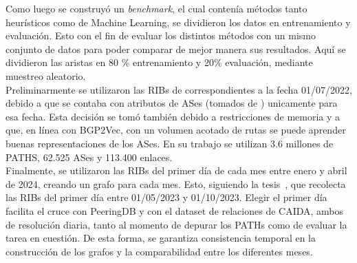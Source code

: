 Como luego se construyó un \textit{benchmark}, el cual contenía métodos tanto heurísticos como de Machine Learning, se dividieron los datos en entrenamiento y evaluación. Esto con el fin de evaluar los distintos métodos con un mismo conjunto de datos para poder comparar de mejor manera sus resultados. Aquí se dividieron las aristas en 80 \% entrenamiento y 20\% evaluación, mediante muestreo aleatorio.\\

Preliminarmente se utilizaron las RIBs de correspondientes a la fecha 01/07/2022,
debido a que se contaba con atributos de ASes (tomados de \cite{BenchmarkingGNN}) unicamente para esa fecha. Esta decisión se tomó también debido a restricciones de memoria y a que, en línea con BGP2Vec, con un volumen acotado de rutas se puede aprender buenas representaciones de los ASes. En su trabajo se utilizan 3.6 millones de PATHS, 62.525 ASes y 113.400 enlaces. \\







Finalmente, se utilizaron las RIBs del primer día de cada mes entre enero y abril de 2024, creando un grafo para cada mes. Esto, siguiendo la tesis~\cite{TesisAlessioMobiliaTesis}, que recolecta las RIBs del primer día entre 01/05/2023 y 01/10/2023. Elegir el primer día facilita el cruce con PeeringDB y con el dataset de relaciones de CAIDA, ambos de resolución diaria, tanto al momento de depurar los PATHs como de evaluar la tarea en cuestión. 
De esta forma, se garantiza consistencia temporal en la construcción de los grafos y la comparabilidad entre los diferentes meses.\\


